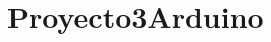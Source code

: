 \chapter{Proyecto3\+Arduino}
\hypertarget{md__r_e_a_d_m_e}{}\label{md__r_e_a_d_m_e}
\label{md__r_e_a_d_m_e_autotoc_md0}%
%
